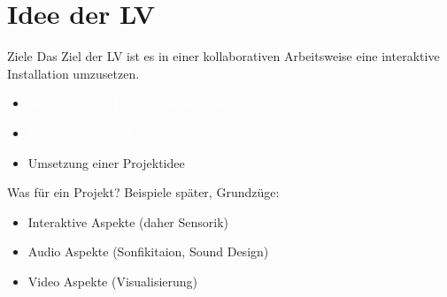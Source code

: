 \section{Idee der LV}
 \frame{\sectionpage}

\begin{frame}{Ziele}
Das Ziel der LV ist es in einer kollaborativen Arbeitsweise eine interaktive Installation umzusetzen.

\begin{itemize}
    \item \textcolor{white}{Aneignung von Programmierkenntnissen}
    \item \textcolor{white}{Koordination von Expertise}
    \item \textcolor{red2}{Umsetzung einer Projektidee}
\end{itemize}
    
\end{frame}

\begin{frame}{Was für ein Projekt?}
Beispiele später, Grundzüge:

\begin{itemize}
    \item Interaktive Aspekte (daher Sensorik)
    \item Audio Aspekte (Sonfikitaion, Sound Design)
    \item Video Aspekte (Visualisierung)
\end{itemize}

\end{frame}






    



    
